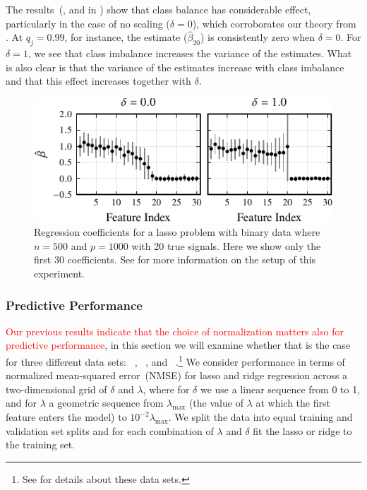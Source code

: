 The results~(, and  in
) show that class balance has considerable effect,
particularly in the case of no scaling (\(\delta = 0\)), which corroborates our theory from
. At \(q_j=0.99\), for instance, the estimate
(\(\hat{\beta}_{20}\)) is consistently zero when \(\delta = 0\). For \(\delta=1\), we see
that class imbalance increases the variance of the estimates. What is also clear is that
the variance of the estimates increase with class imbalance and that this effect increases
together with \(\delta\).

\begin{figure}[htpb]
  \centering
  \includegraphics[]{plots/binary_decreasing_small.pdf}
  \caption{%
    Regression coefficients for a lasso problem with binary data where \(n = 500\) and
    \(p = \num{1000}\) with 20 true signals. Here we show only the first 30
    coefficients. See  for more information
    on the setup of this experiment.
  }
  \label{fig:binary-decreasing}
\end{figure}

\subsubsection{Predictive Performance}%
\label{sec:experiments-hyperparameter}

\textcolor{red}{Our previous results indicate that the choice of normalization matters also for predictive
performance}, in this section we will examine whether that is the case for three
different data sets: ~\citep{becker1996}, ~\citep{rhee2006}, and
~\citep{platt1998}.\footnote{See  for details about these
  data sets.} We consider performance in terms of normalized mean-squared error~(NMSE) for
lasso and ridge regression across a two-dimensional grid of \(\delta\) and \(\lambda\),
where for \(\delta\) we use a linear sequence from 0 to 1, and for \(\lambda\) a geometric
sequence from \(\lambda_\text{max}\) (the value of \(\lambda\) at which the first feature
enters the model) to \(10^{-2}\lambda_\text{max}\). We split the data into equal training
and validation set splits and for each combination of \(\lambda\) and \(\delta\) fit the
lasso or ridge to the training set.

